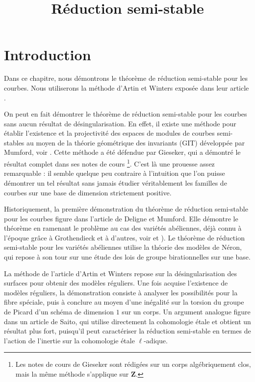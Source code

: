 

%


\title{Réduction semi-stable}


\maketitle

\label{section-phantom}

\tableofcontents

\section{Introduction}
\label{section-introduction}

\noindent
Dans ce chapitre, nous démontrons le théorème de réduction semi-stable pour les courbes.
Nous utiliserons la méthode d'Artin et Winters exposée dans leur article
\cite{Artin-Winters}.

\medskip\noindent
On peut en fait démontrer le théorème de réduction semi-stable
pour les courbes sans aucun résultat de désingularisation. En effet, il
existe une méthode pour établir l'existence et la projectivité des espaces de modules
de courbes semi-stables au moyen de la théorie géométrique des invariants (GIT)
développée par Mumford, voir \cite{GIT}. Cette méthode a été
défendue par Gieseker, qui a démontré le résultat complet dans ses
notes de cours \cite{Gieseker}\footnote{Les notes de cours de Gieseker
sont rédigées sur un corps algébriquement clos, mais la même méthode
s'applique sur $\mathbf{Z}$.}. C'est là une prouesse
assez remarquable : il semble quelque peu contraire à l'intuition que l'on puisse
démontrer un tel résultat sans jamais étudier véritablement les familles de courbes sur
une base de dimension strictement positive.

\medskip\noindent
Historiquement, la première démonstration du théorème de réduction semi-stable
pour les courbes figure dans l'article \cite{DM} de Deligne et Mumford.
Elle démontre le théorème en ramenant le problème au cas des
variétés abéliennes, déjà connu à l'époque grâce
à Grothendieck et à d'autres, voir \cite{SGA7-I} et \cite{SGA7-II}).
Le théorème de réduction semi-stable pour les variétés abéliennes utilise la théorie
des modèles de Néron, qui repose à son tour sur une étude des lois de groupe
birationnelles sur une base.

\medskip\noindent
La méthode de l'article d'Artin et Winters repose sur la désingularisation
des surfaces pour obtenir des modèles réguliers. Une fois acquise l'existence
de modèles réguliers, la démonstration consiste à analyser les
possibilités pour la fibre spéciale, puis à conclure au moyen d'une inégalité
sur la torsion du groupe de Picard d'un schéma de dimension $1$ sur un corps.
Un argument analogue figure dans un article \cite{Saito} de Saito, qui utilise
directement la cohomologie étale et obtient un résultat plus fort, puisqu'il
peut caractériser la réduction semi-stable en termes de l'action de
l'inertie sur la cohomologie étale $\ell$-adique.

